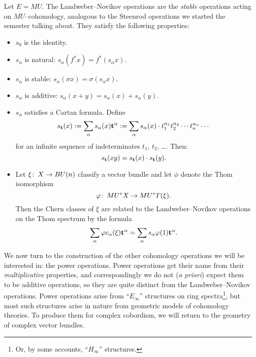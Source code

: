 \begin{remark}
Let $E = MU$.  The Landweber--Novikov operations are the \emph{stable} operations acting on $MU$--cohomology, analogous to the Steenrod operations we started the semester talking about.  They satisfy the following properties:
\begin{itemize}
\item $s_0$ is the identity.
\item $s_\alpha$ is natural: $s_\alpha(f^* x) = f^*(s_\alpha x)$.
\item $s_\alpha$ is stable: $s_\alpha(\sigma x) = \sigma(s_\alpha x)$.
\item $s_\alpha$ is additive: $s_\alpha(x + y) = s_\alpha(x) + s_\alpha(y)$.
\item $s_\alpha$ satisfies a Cartan formula.  Define \[s_{\mathbf t}(x) := \sum_{\alpha} s_\alpha(x) \mathbf t^\alpha := \sum_\alpha s_\alpha(x) \cdot t_1^{\alpha_1} t_2^{\alpha_2} \cdots t_n^{\alpha_n} \cdots\] for an infinite sequence of indeterminates $t_1$, $t_2$, \ldots.  Then: \[s_{\mathbf t}(x y) = s_{\mathbf t}(x) \cdot s_{\mathbf t}(y).\]
\item Let $\xi\colon\thinspace X \to BU(n)$ classify a vector bundle and let $\phi$ denote the Thom isomorphism \[\varphi\colon\thinspace MU^* X \to MU^* T(\xi).\]  Then the Chern classes of $\xi$ are related to the Landweber--Novikov operations on the Thom spectrum by the formula \[\sum_\alpha \varphi c_\alpha(\xi) \mathbf t^\alpha = \sum_\alpha s_\alpha \varphi(1) \mathbf t^\alpha.\]  
\end{itemize}
\end{remark}







We now turn to the construction of the other cohomology operations we will be interested in: the power operations.  Power operations get their name from their \emph{multiplicative} properties, and correspondingly we do not (\textit{a priori}) expect them to be additive operations, so they are quite distinct from the Landweber--Novikov operations.  Power operations arise from ``$E_\infty$'' structures on ring spectra\footnote{Or, by some accounts, ``$H_\infty$'' structures.}, but most such structures arise in nature from geometric models of cohomology theories.  To produce them for complex cobordism, we will return to the geometry of complex vector bundles.

